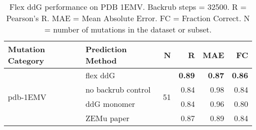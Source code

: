 \begin{table}
  \begin{tabular}{llrrrr}
\toprule
Mutation Category &   Prediction Method &   N &    R &  MAE &   FC \\
\midrule
 \multirow{ 4}{*}{pdb-1EMV} & flex ddG & \multirow{ 4}{*}{51} & \textbf{0.89} & \textbf{0.87} & \textbf{0.86}  \\
 & no backrub control & & 0.84 & 0.98 & 0.84  \\
 & ddG monomer & & 0.84 & 0.96 & 0.80  \\
 & ZEMu paper & & 0.87 & 0.89 & 0.84  \\
\bottomrule
\end{tabular}
  \caption[Flex ddG performance on PDB 1EMV]{
    Flex ddG performance on PDB 1EMV. Backrub steps = 32500. R = Pearson's R. MAE = Mean Absolute Error. FC = Fraction Correct. N = number of mutations in the dataset or subset.
  } \label{tab:table-pdb-1EMV}
\end{table}
